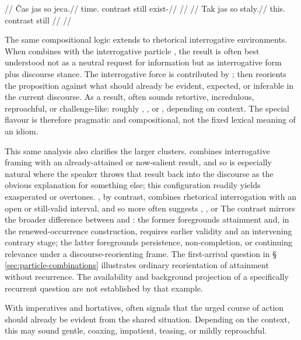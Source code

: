 \pex
\a
\begingl
\glpreamble {}//
\gla Čas jas so jeca.//
\glb time.\Dir{} contrast still exist-\Cont{}//
\glft {}//
\endgl
\a
\begingl
\glpreamble {}//
\gla Tak jas so staly.//
\glb this.\Dir{} contrast still \Neg{}//
\glft {}//
\endgl
\xe

The same compositional logic extends to rhetorical interrogative environments.
When  combines with the interrogative particle , the result is often
best understood not as a neutral request for information but as interrogative
form plus discourse stance. The interrogative force is contributed by
;  then reorients the proposition against what should already
be evident, expected, or inferable in the current discourse. As a result,
 often sounds retortive, incredulous, reproachful, or
challenge-like: roughly , , or
, depending on context. The special flavour is
therefore pragmatic and compositional, not the fixed lexical meaning of an
idiom.

This same analysis also clarifies the larger clusters.  combines
interrogative framing with an already-attained or now-salient result, and so
is especially natural where the speaker throws that result back into the
discourse as the obvious explanation for something else; this configuration
readily yields exasperated or  overtones.
, by contrast, combines rhetorical interrogation with an open or
still-valid interval, and so more often suggests , , or  The contrast mirrors the broader difference between
 and : the former foregrounds attainment and, in
the renewed-occurrence construction, requires earlier validity and an
intervening contrary stage; the latter foregrounds persistence,
non-completion, or continuing relevance under a discourse-reorienting frame.
The first-arrival question in §\,\ref{sec:particle-combinations} illustrates
ordinary reorientation of attainment without recurrence. The availability
and background projection of a specifically recurrent question are not
established by that example.

With imperatives and hortatives,  often signals that the urged course
of action should already be evident from the shared situation. Depending on the
context, this may sound gentle, coaxing, impatient, teasing, or mildly
reproachful.

